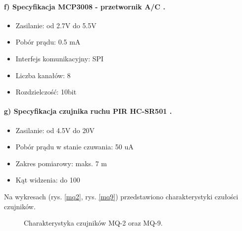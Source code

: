 \paragraph{f) Specyfikacja MCP3008 - przetwornik A/C \protect\cite{specyfikacjaAC}.}
\begin{itemize} 
\item Zasilanie: od 2.7V do 5.5V
\item Pobór prądu: 0.5 mA
\item Interfejs komunikacyjny: SPI
\item Liczba kanałów: 8
\item Rozdzielczość: 10bit
\end{itemize}
\paragraph{g) Specyfikacja czujnika ruchu PIR HC-SR501 \protect\cite{pir}.}
\begin{itemize} 
\item Zasilanie: od 4.5V do 20V
\item Pobór prądu w stanie czuwania: 50 uA
\item Zakres pomiarowy: maks. 7 m
\item Kąt widzenia: do 100\textdegree{}
\end{itemize}
Na wykresach (rys. \ref{mq2}, rys. \ref{mq9}) przedstawiono charakterystyki czułości czujników.
\begin{figure}[ht]
	\centering
	\hfill
	\caption{Charakterystyka czujników MQ-2 oraz MQ-9.}
	\label{mq2_mq9}
\end{figure}
